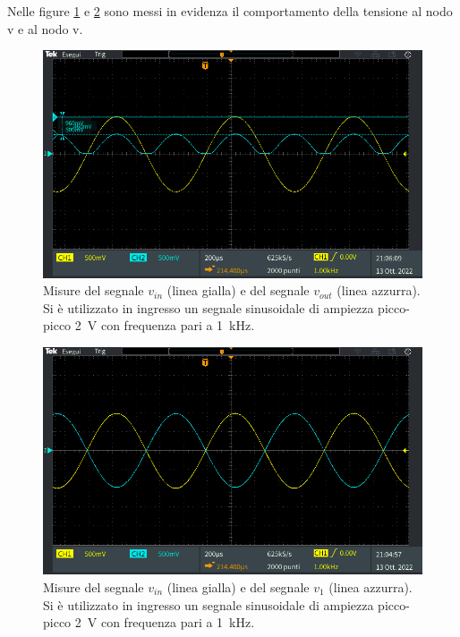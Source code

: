 \noindent
Nelle figure \ref{fig:analisi_circuito_3_1} e \ref{fig:analisi_circuito_3_2} sono messi in evidenza il comportamento della tensione al nodo v e al nodo v.
\begin{figure}[h]
	\centering
	\includegraphics[width=1\linewidth]{./ImageFiles/Laboratorio 2/TEK00043}
	\caption{Misure del segnale $v_{in}$ (linea gialla) e del segnale $v_{out}$ (linea azzurra). Si è utilizzato in ingresso un segnale sinusoidale di ampiezza picco-picco \SI{2}{\volt} con frequenza pari a \SI{1}{\kilo\hertz}.}
	\label{fig:analisi_circuito_3_1}
\end{figure}
\begin{figure}[h]
	\centering
	\includegraphics[width=1\linewidth]{./ImageFiles/Laboratorio 2/TEK00042}
	\caption{Misure del segnale $v_{in}$ (linea gialla) e del segnale $v_{1}$ (linea azzurra). Si è utilizzato in ingresso un segnale sinusoidale di ampiezza picco-picco \SI{2}{\volt} con frequenza pari a \SI{1}{\kilo\hertz}.}
	\label{fig:analisi_circuito_3_2}
\end{figure}

